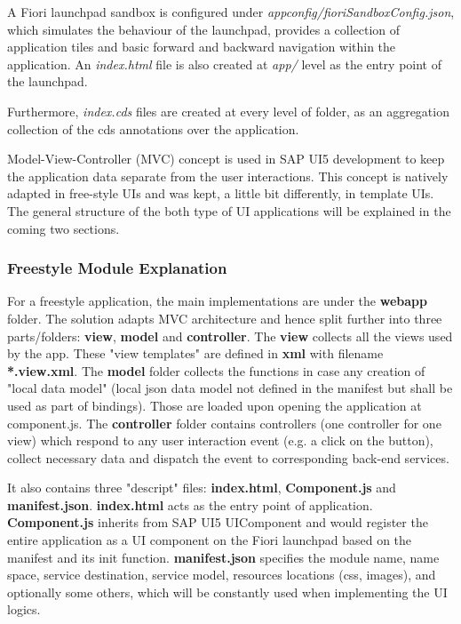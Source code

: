 A Fiori launchpad sandbox is configured under \textit{appconfig/fioriSandboxConfig.json}, which simulates the behaviour of the launchpad, provides a collection of application tiles and basic forward and backward navigation within the application. An \textit{index.html} file is also created at \textit{app/} level as the entry point of the launchpad.

Furthermore, \textit{index.cds} files are created at every level of folder, as an aggregation collection of the cds annotations over the application.

Model-View-Controller (MVC) concept is used in SAP UI5 development to keep the application data separate from the user interactions. This concept is natively adapted in free-style UIs and was kept, a little bit differently, in template UIs. The general structure of the both type of UI applications will be explained in the coming two sections. 

\subsubsection{Freestyle Module Explanation}
For a freestyle application, the main implementations are under the \textbf{webapp} folder. The solution adapts MVC architecture and hence split further into three parts/folders: \textbf{view}, \textbf{model} and \textbf{controller}. The \textbf{view} collects all the views used by the app. These "view templates" are defined in \textbf{xml} with filename \textbf{*.view.xml}. The \textbf{model} folder collects the functions in case any creation of "local data model" (local json data model not defined in the manifest but shall be used as part of bindings). Those are loaded upon opening the application at component.js. The \textbf{controller} folder contains controllers (one controller for one view) which respond to any user interaction event (e.g. a click on the button), collect necessary data and dispatch the event to corresponding back-end services.

It also contains three "descript" files: \textbf{index.html}, \textbf{Component.js} and \textbf{manifest.json}. \textbf{index.html} acts as the entry point of application.  \textbf{Component.js} inherits from SAP UI5 UIComponent and would register the entire application as a UI component on the Fiori launchpad based on the manifest and its init function. \textbf{manifest.json} specifies the module name, name space, service destination, service model, resources locations (css, images), and optionally some others, which will be constantly used when implementing the UI logics.

